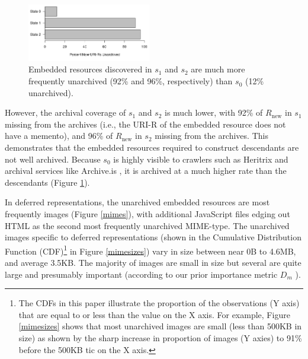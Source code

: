 \documentclass{sig-alternate}
\begin{document}
\begin{figure}
\centering
\includegraphics[width=0.48\textwidth]{./imgs/archivedByDepthPctHorz.png}
\caption{Embedded resources discovered in $s_1$ and $s_2$ are much more frequently unarchived (92\% and 96\%, respectively) than $s_0$ (12\% unarchived).}
\label{depth}
\end{figure}


However, the archival coverage of $s_1$ and $s_2$ is much lower, with 92\% of $R_{\text{new}}$ in $s_1$ missing from the archives (i.e., the URI-R of the embedded resource does not have a memento), and 96\% of $R_{\text{new}}$ in $s_2$ missing from the archives. This demonstrates that the embedded resources required to construct descendants are not well archived. Because $s_0$ is highly visible to crawlers such as Heritrix and archival services like Archive.is \cite{archivetoday}, it is archived at a much higher rate than the descendants (Figure \ref{depth}).



In deferred representations, the unarchived embedded resources are most frequently images (Figure \ref{mimes}), with additional JavaScript files edging out HTML as the second most frequently unarchived MIME-type. The unarchived images specific to deferred representations (shown in the Cumulative Distribution Function (CDF)\footnote{The CDFs in this paper illustrate the proportion of the observations (Y axis) that are equal to or less than the value on the X axis. For example, Figure \ref{mimesizes} shows that most unarchived images are small (less than 500KB in size) as shown by the sharp increase in proportion of images (Y axies) to 91\% before the 500KB tic on the X axis.} in Figure \ref{mimesizes}) vary in size between near 0B to 4.6MB, and average 3.5KB. The majority of images are small in size but several are quite large and presumably important (according to our prior importance metric $D_m$ \cite{damageIJDL}).




\end{document}
